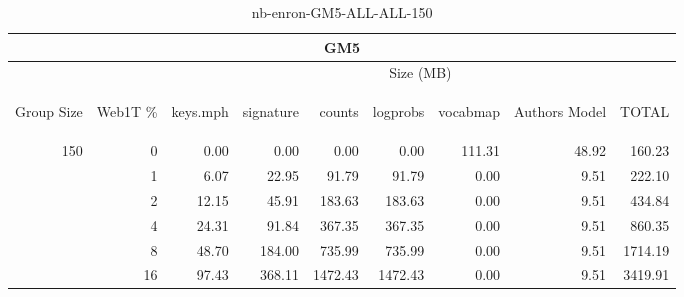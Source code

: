 \begin{center}
\begin{table}[htbp]
\begin{tabular}{ | r | r | r | r | r | r | r | r | r |}
\hline
\multicolumn{9}{|c|}{GM5}\\
\hline
 & & \multicolumn{7}{|c|}{Size (MB)}\\ \cline{3-9}
\begin{sideways}Group Size\end{sideways} & \begin{sideways}Web1T \% \end{sideways} & \begin{sideways}keys.mph\end{sideways} & \begin{sideways}signature\end{sideways} & \begin{sideways}counts\end{sideways} & \begin{sideways}logprobs\end{sideways} & \begin{sideways}vocabmap\end{sideways} & \begin{sideways}Authors Model \end{sideways} & \begin{sideways}TOTAL\end{sideways}\\
\hline
\multirow{5}{*}{150}
 & 0 & 0.00 & 0.00 & 0.00 & 0.00 & 111.31 & 48.92 & 160.23\\ \cline{2-9}
 & 1 & 6.07 & 22.95 & 91.79 & 91.79 & 0.00 & 9.51 & 222.10\\ \cline{2-9}
 & 2 & 12.15 & 45.91 & 183.63 & 183.63 & 0.00 & 9.51 & 434.84\\ \cline{2-9}
 & 4 & 24.31 & 91.84 & 367.35 & 367.35 & 0.00 & 9.51 & 860.35\\ \cline{2-9}
 & 8 & 48.70 & 184.00 & 735.99 & 735.99 & 0.00 & 9.51 & 1714.19\\ \cline{2-9}
 & 16 & 97.43 & 368.11 & 1472.43 & 1472.43 & 0.00 & 9.51 & 3419.91\\ \cline{2-9}
\hline
\end{tabular}
\caption{nb-enron-GM5-ALL-ALL-150}
\label{table:nb-enron-GM5-ALL-ALL-150}
\end{table}
\end{center}


